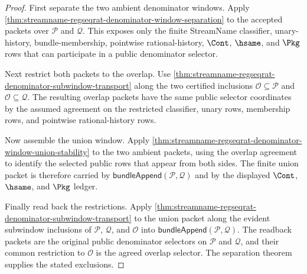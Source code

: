 \begin{proof}
First separate the two ambient denominator windows. Apply
\autoref{thm:streamname-regseqrat-denominator-window-separation} to the accepted
packets over $\mathcal P$ and $\mathcal Q$. This exposes only the finite
StreamName classifier, unary-history, bundle-membership, pointwise
rational-history, $\Cont$, $\hsame$, and $\Pkg$ rows that can participate in a
public denominator selector.

Next restrict both packets to the overlap. Use
\autoref{thm:streamname-regseqrat-denominator-subwindow-transport} along the two
certified inclusions $\mathcal O\subseteq\mathcal P$ and
$\mathcal O\subseteq\mathcal Q$. The resulting overlap packets have the same
public selector coordinates by the assumed agreement on the restricted
classifier, unary rows, membership rows, and pointwise rational-history rows.

Now assemble the union window. Apply
\autoref{thm:streamname-regseqrat-denominator-window-union-stability} to the two
ambient packets, using the overlap agreement to identify the selected public
rows that appear from both sides. The finite union packet is therefore carried by
$\mathsf{bundleAppend}(\mathcal P,\mathcal Q)$ and by the displayed $\Cont$,
$\hsame$, and $\Pkg$ ledger.

Finally read back the restrictions. Apply
\autoref{thm:streamname-regseqrat-denominator-subwindow-transport} to the union
packet along the evident subwindow inclusions of $\mathcal P$, $\mathcal Q$, and
$\mathcal O$ into $\mathsf{bundleAppend}(\mathcal P,\mathcal Q)$. The readback
packets are the original public denominator selectors on $\mathcal P$ and
$\mathcal Q$, and their common restriction to $\mathcal O$ is the agreed overlap
selector. The separation theorem supplies the stated exclusions.
\end{proof}

